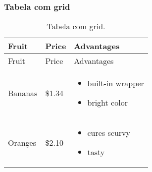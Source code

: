\hypertarget{tabela-com-grid}{%
\subsubsection{Tabela com grid}\label{tabela-com-grid}}

\begin{longtable}[]{@{}lll@{}}
\caption{Tabela com grid.}\tabularnewline
\toprule
\begin{minipage}[b]{0.20\columnwidth}\raggedright
Fruit\strut
\end{minipage} & \begin{minipage}[b]{0.20\columnwidth}\raggedright
Price\strut
\end{minipage} & \begin{minipage}[b]{0.27\columnwidth}\raggedright
Advantages\strut
\end{minipage}\tabularnewline
\midrule
\endfirsthead
\toprule
\begin{minipage}[b]{0.20\columnwidth}\raggedright
Fruit\strut
\end{minipage} & \begin{minipage}[b]{0.20\columnwidth}\raggedright
Price\strut
\end{minipage} & \begin{minipage}[b]{0.27\columnwidth}\raggedright
Advantages\strut
\end{minipage}\tabularnewline
\midrule
\endhead
\begin{minipage}[t]{0.20\columnwidth}\raggedright
Bananas\strut
\end{minipage} & \begin{minipage}[t]{0.20\columnwidth}\raggedright
\$1.34\strut
\end{minipage} & \begin{minipage}[t]{0.27\columnwidth}\raggedright
\begin{itemize}
\tightlist
\item
  built-in wrapper
\item
  bright color
\end{itemize}\strut
\end{minipage}\tabularnewline
\begin{minipage}[t]{0.20\columnwidth}\raggedright
Oranges\strut
\end{minipage} & \begin{minipage}[t]{0.20\columnwidth}\raggedright
\$2.10\strut
\end{minipage} & \begin{minipage}[t]{0.27\columnwidth}\raggedright
\begin{itemize}
\tightlist
\item
  cures scurvy
\item
  tasty
\end{itemize}\strut
\end{minipage}\tabularnewline
\bottomrule
\end{longtable}


